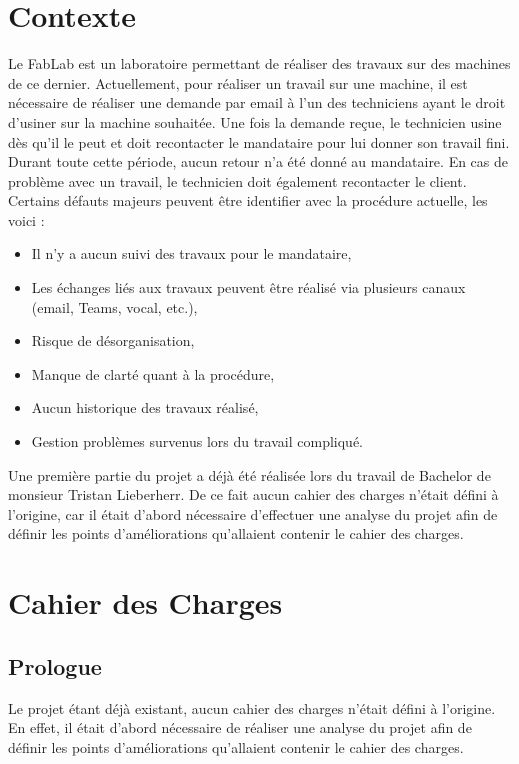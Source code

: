 \documentclass[
    iai, %
    il, %
]{heig-tb}
\begin{document}
\section{Contexte}
Le FabLab est un laboratoire permettant de réaliser des travaux sur des machines de ce dernier. Actuellement, pour réaliser un travail sur une machine, il est nécessaire de réaliser une demande par email à l'un des techniciens ayant le droit d'usiner sur la machine souhaitée. Une fois la demande reçue, le technicien usine dès qu'il le peut et doit recontacter le mandataire pour lui donner son travail fini. Durant toute cette période, aucun retour n'a été donné au mandataire. En cas de problème avec un travail, le technicien doit également recontacter le client.
Certains défauts majeurs peuvent être identifier avec la procédure actuelle, les voici :
\begin{itemize}
    \item Il n'y a aucun suivi des travaux pour le mandataire, \cite{lieberherr}
    \item Les échanges liés aux travaux peuvent être réalisé via plusieurs canaux (email, Teams, vocal, etc.), \cite{lieberherr}
    \item Risque de désorganisation, \cite{lieberherr}
    \item Manque de clarté quant à la procédure, \cite{lieberherr}
    \item Aucun historique des travaux réalisé,
    \item Gestion problèmes survenus lors du travail compliqué.
\end{itemize}
Une première partie du projet a déjà été réalisée lors du travail de Bachelor de monsieur Tristan Lieberherr. De ce fait aucun cahier des charges n'était défini à l'origine, car il était d'abord nécessaire d'effectuer une analyse du projet afin de définir les points d'améliorations qu'allaient contenir le cahier des charges.


\section{Cahier des Charges}

\subsection{Prologue}

Le projet étant déjà existant, aucun cahier des charges n'était défini à
l'origine. En effet, il était d'abord nécessaire de réaliser une analyse
du projet afin de définir les points d'améliorations qu'allaient
contenir le cahier des charges.
\end{document}
